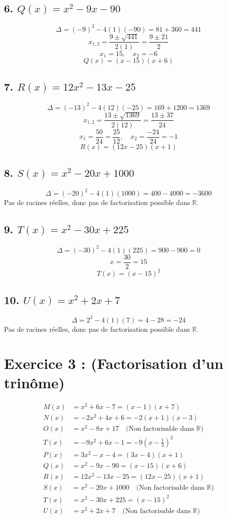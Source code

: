 \documentclass[12pt]{article}
\begin{document}
\subsection*{6. \( Q(x) = x^2 - 9x - 90 \)}
\[
\Delta = (-9)^2 - 4(1)(-90) = 81 + 360 = 441
\]
\[
x_{1,2} = \frac{9 \pm \sqrt{441}}{2(1)} = \frac{9 \pm 21}{2}
\]
\[
x_1 = 15, \quad x_2 = -6
\]
\[
Q(x) = (x - 15)(x + 6)
\]

\subsection*{7. \( R(x) = 12x^2 - 13x - 25 \)}
\[
\Delta = (-13)^2 - 4(12)(-25) = 169 + 1200 = 1369
\]
\[
x_{1,2} = \frac{13 \pm \sqrt{1369}}{2(12)} = \frac{13 \pm 37}{24}
\]
\[
x_1 = \frac{50}{24} = \frac{25}{12}, \quad x_2 = \frac{-24}{24} = -1
\]
\[
R(x) = (12x - 25)(x + 1)
\]

\subsection*{8. \( S(x) = x^2 - 20x + 1000 \)}
\[
\Delta = (-20)^2 - 4(1)(1000) = 400 - 4000 = -3600
\]
Pas de racines réelles, donc pas de factorisation possible dans \(\mathbb{R}\).

\subsection*{9. \( T(x) = x^2 - 30x + 225 \)}
\[
\Delta = (-30)^2 - 4(1)(225) = 900 - 900 = 0
\]
\[
x = \frac{30}{2} = 15
\]
\[
T(x) = (x - 15)^2
\]

\subsection*{10. \( U(x) = x^2 + 2x + 7 \)}
\[
\Delta = 2^2 - 4(1)(7) = 4 - 28 = -24
\]
Pas de racines réelles, donc pas de factorisation possible dans \(\mathbb{R}\).

\section*{Exercice 3 : (Factorisation d’un trinôme)}

\begin{align*}
M(x) &= x^2 + 6x - 7 = (x - 1)(x + 7) \\[5pt]
N(x) &= -2x^2 + 4x + 6 = -2(x + 1)(x - 3) \\[5pt]
O(x) &= x^2 - 8x + 17 \quad \text{(Non factorisable dans $\mathbb{R}$)} \\[5pt]
T(x) &= -9x^2 + 6x - 1 = -9 \left( x - \frac{1}{3} \right)^2 \\[5pt]
P(x) &= 3x^2 - x - 4 = (3x - 4)(x + 1) \\[5pt]
Q(x) &= x^2 - 9x - 90 = (x - 15)(x + 6) \\[5pt]
R(x) &= 12x^2 - 13x - 25 = (12x - 25)(x + 1) \\[5pt]
S(x) &= x^2 - 20x + 1000 \quad \text{(Non factorisable dans $\mathbb{R}$)} \\[5pt]
T(x) &= x^2 - 30x + 225 = (x - 15)^2 \\[5pt]
U(x) &= x^2 + 2x + 7 \quad \text{(Non factorisable dans $\mathbb{R}$)}
\end{align*}
\end{document}
